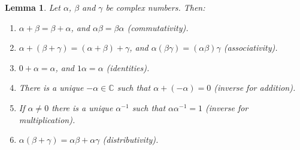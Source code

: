 \documentclass{article}
\theoremstyle{plain}
\newtheorem{lemma}[theorem]{Lemma}{\bfseries}{\upshape}
\newcommand{\bC}{\mathbb{C}}
\begin{document}
\begin{lemma}\label{L:LA1props}
Let $\alpha$, $\beta$ and $\gamma$ be complex numbers. Then:
\begin{enumerate}
\item $\alpha + \beta = \beta + \alpha$, and $\alpha\beta = \beta\alpha$ (commutativity).
\item $\alpha + (\beta + \gamma) = (\alpha + \beta) +\gamma$, and $\alpha(\beta\gamma) = (\alpha\beta)\gamma$ (associativity).
\item $0 + \alpha = \alpha$, and $1\alpha = \alpha$ (identities).
\item There is a unique $-\alpha\in\bC$ such that $\alpha + (-\alpha) = 0$ (inverse for addition).
\item If $\alpha\neq 0$ there is a unique $\alpha^{-1}$ such that $\alpha\alpha^{-1} = 1$ (inverse for multiplication).
\item $\alpha(\beta + \gamma) = \alpha\beta + \alpha\gamma$ (distributivity). 
\end{enumerate}
\end{lemma}
\end{document}
